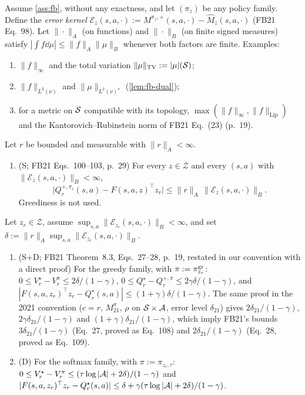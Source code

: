 \begin{theorem}\label{thm:fb-approx}
Assume \cref{ass:fb}, without any exactness, and let $(\pi_z)$ be any policy family.
Define the \emph{error kernel} $\mathcal E_z(s,a,\cdot):=M^{\pi_z,+}(s,a,\cdot)-\hat M_z(s,a,\cdot)$ (FB21 Eq.~98).
Let $\|\cdot\|_A$ (on functions) and $\|\cdot\|_B$ (on finite signed measures) satisfy $|\int f\dd\mu|\le\|f\|_A\|\mu\|_B$ whenever both factors are finite. Examples:
\begin{enumerate}[nosep,label=(N\arabic*)]
\item $\|f\|_\infty$ and the total variation $\|\mu\|_{\mathrm{TV}}:=|\mu|(\mathcal{S})$;
\item $\|f\|_{L^2(\nu)}$ and $\|\mu\|_{L^2(\nu)^\star}$ (\cref{lem:fb-dual});
\item for a metric on $\mathcal{S}$ compatible with its topology, $\max(\|f\|_\infty,\|f\|_{\mathrm{Lip}})$ and the Kantorovich--Rubinstein norm of FB21 Eq.~(23) (p.~19).
\end{enumerate}
Let $r$ be bounded and measurable with $\|r\|_A<\infty$.
\begin{enumerate}[nosep,label=(\alph*)]
\item (\textsf{S}; FB21 Eqs.~100--103, p.~29) For every $z\in\mathcal Z$ and every $(s,a)$ with $\|\mathcal E_z(s,a,\cdot)\|_B<\infty$,
  \[\big|Q^{+,\pi_z}_r(s,a)-F(s,a,z)^\top z_r\big|\le\|r\|_A\,\|\mathcal E_z(s,a,\cdot)\|_B .\]
  Greediness is not used.
\end{enumerate}
Let $z_r\in\mathcal Z$, assume $\sup_{s,a}\|\mathcal E_{z_r}(s,a,\cdot)\|_B<\infty$, and set $\delta:=\|r\|_A\sup_{s,a}\|\mathcal E_{z_r}(s,a,\cdot)\|_B$.
\begin{enumerate}[resume*]
\item (\textsf{S+D}; FB21 Theorem~8.3, Eqs.~27--28, p.~19, restated in our convention with a direct proof) For the greedy family, with $\pi:=\pi^{\mathrm{gr}}_{z_r}$:
  $0\le V^\star_r-V^\pi_r\le2\delta/(1-\gamma)$, $0\le Q^\star_r-Q^{+,\pi}_r\le2\gamma\delta/(1-\gamma)$, and $|F(s,a,z_r)^\top z_r-Q^\star_r(s,a)|\le(1+\gamma)\delta/(1-\gamma)$.
  The same proof in the 2021 convention ($c=r$, $M^\pi_{21}$, $\rho$ on $\mathcal{S}\times\mathcal{A}$, error level $\delta_{21}$) gives $2\delta_{21}/(1-\gamma)$, $2\gamma\delta_{21}/(1-\gamma)$ and $(1+\gamma)\delta_{21}/(1-\gamma)$, which imply FB21's bounds $3\delta_{21}/(1-\gamma)$ (Eq.~27, proved as Eq.~108) and $2\delta_{21}/(1-\gamma)$ (Eq.~28, proved as Eq.~109).
\item (\textsf{D}) For the softmax family, with $\pi:=\pi_{z_r,\tau}$:
  $0\le V^\star_r-V^\pi_r\le(\tau\log|\mathcal{A}|+2\delta)/(1-\gamma)$ and $|F(s,a,z_r)^\top z_r-Q^\star_r(s,a)|\le\delta+\gamma(\tau\log|\mathcal{A}|+2\delta)/(1-\gamma)$.

\end{enumerate}
\end{theorem}

